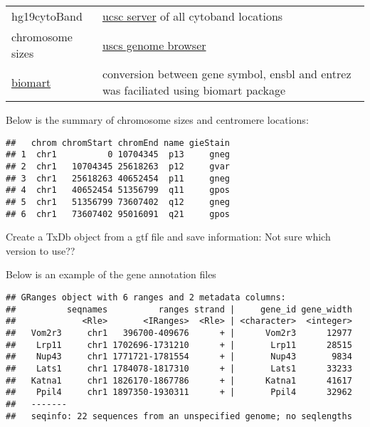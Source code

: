 \documentclass[
]{book}
\begin{document}
\begin{longtable}[]{@{}ll@{}}
\begin{minipage}[t]{0.30\columnwidth}
hg19cytoBand\strut
\end{minipage} & \begin{minipage}[t]{0.64\columnwidth}\raggedright
\href{http://hgdownload.cse.ucsc.edu/goldenPath/hg19/database/cytoBand.txt.gz}{ucsc server} of all cytoband locations\strut
\end{minipage}\tabularnewline
\begin{minipage}[t]{0.30\columnwidth}\raggedright
chromosome sizes\strut
\end{minipage} & \begin{minipage}[t]{0.64\columnwidth}\raggedright
\href{http://hgdownload.cse.ucsc.edu/goldenPath/hg19/database/chromInfo.txt.gz}{uscs genome browser}\strut
\end{minipage}\tabularnewline
\begin{minipage}[t]{0.30\columnwidth}\raggedright
\href{https://bioconductor.org/packages/release/bioc/html/biomaRt.html}{biomart}\strut
\end{minipage} & \begin{minipage}[t]{0.64\columnwidth}\raggedright
conversion between gene symbol, ensbl and entrez was faciliated using biomart package\strut
\end{minipage}\tabularnewline
\bottomrule
\end{longtable}

Below is the summary of chromosome sizes and centromere locations:

\begin{verbatim}
##   chrom chromStart chromEnd name gieStain
## 1  chr1          0 10704345  p13     gneg
## 2  chr1   10704345 25618263  p12     gvar
## 3  chr1   25618263 40652454  p11     gneg
## 4  chr1   40652454 51356799  q11     gpos
## 5  chr1   51356799 73607402  q12     gneg
## 6  chr1   73607402 95016091  q21     gpos
\end{verbatim}

Create a TxDb object from a gtf file and save information: {Not sure which version to use??}

Below is an example of the gene annotation files

\begin{verbatim}
## GRanges object with 6 ranges and 2 metadata columns:
##          seqnames          ranges strand |     gene_id gene_width
##             <Rle>       <IRanges>  <Rle> | <character>  <integer>
##   Vom2r3     chr1   396700-409676      + |      Vom2r3      12977
##    Lrp11     chr1 1702696-1731210      + |       Lrp11      28515
##    Nup43     chr1 1771721-1781554      + |       Nup43       9834
##    Lats1     chr1 1784078-1817310      + |       Lats1      33233
##   Katna1     chr1 1826170-1867786      + |      Katna1      41617
##    Ppil4     chr1 1897350-1930311      + |       Ppil4      32962
##   -------
##   seqinfo: 22 sequences from an unspecified genome; no seqlengths
\end{verbatim}
\end{document}
